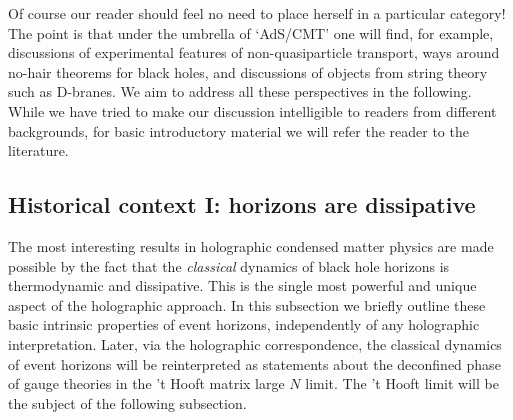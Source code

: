 \documentclass[10pt, oneside]{book}
\begin{document}
\begin{doublespace}
\begin{itemize}
\end{itemize}

Of course our reader should feel no need to place herself in a particular category! The point is that under the umbrella of `AdS/CMT' one will find, for example, discussions of experimental features of non-quasiparticle transport, ways around no-hair theorems for black holes, and discussions of objects from string theory such as D-branes. We aim to address all these perspectives in the following. While we have tried to make our discussion intelligible to readers from different backgrounds, for basic introductory material we will refer the reader to the literature.

\subsection{Historical context I: horizons are dissipative}
\label{sec:horizons}

The most interesting results in holographic condensed matter physics are made possible by the fact that the \emph{classical} dynamics of black hole horizons is thermodynamic and dissipative. This is the single most powerful and unique aspect of the holographic approach. In this subsection we briefly outline these basic intrinsic properties of event horizons, independently of any holographic interpretation. Later, via the holographic correspondence, the classical dynamics of event horizons will be reinterpreted as statements about the deconfined phase of gauge theories in the 't Hooft matrix large $N$ limit. The 't Hooft limit will be the subject of the following subsection.


\end{doublespace}
\end{document}
